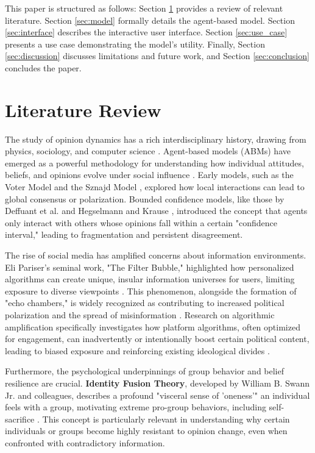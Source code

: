 \documentclass[10pt,a4paper]{article}
\begin{document}
This paper is structured as follows: Section \ref{sec:lit_review} provides a review of relevant literature. Section \ref{sec:model} formally details the agent-based model. Section \ref{sec:interface} describes the interactive user interface. Section \ref{sec:use_case} presents a use case demonstrating the model's utility. Finally, Section \ref{sec:discussion} discusses limitations and future work, and Section \ref{sec:conclusion} concludes the paper.

\section{Literature Review}
\label{sec:lit_review}
The study of opinion dynamics has a rich interdisciplinary history, drawing from physics, sociology, and computer science \citep{opinion_dynamics_review}. Agent-based models (ABMs) have emerged as a powerful methodology for understanding how individual attitudes, beliefs, and opinions evolve under social influence \citep{opinion_dynamics_abm_review}. Early models, such as the Voter Model \citep{voter_model} and the Sznajd Model \citep{sznajd_model}, explored how local interactions can lead to global consensus or polarization. Bounded confidence models, like those by Deffuant et al. \citep{deffuant2000mixing} and Hegselmann and Krause \citep{hegselmann2002opinion}, introduced the concept that agents only interact with others whose opinions fall within a certain "confidence interval," leading to fragmentation and persistent disagreement.

The rise of social media has amplified concerns about information environments. Eli Pariser's seminal work, "The Filter Bubble," highlighted how personalized algorithms can create unique, insular information universes for users, limiting exposure to diverse viewpoints \citep{pariser2011filter}. This phenomenon, alongside the formation of "echo chambers," is widely recognized as contributing to increased political polarization and the spread of misinformation \citep{algorithmic_amplification}. Research on algorithmic amplification specifically investigates how platform algorithms, often optimized for engagement, can inadvertently or intentionally boost certain political content, leading to biased exposure and reinforcing existing ideological divides \citep{algorithmic_amplification_political}.

Furthermore, the psychological underpinnings of group behavior and belief resilience are crucial. \textbf{Identity Fusion Theory}, developed by William B. Swann Jr. and colleagues, describes a profound "visceral sense of 'oneness'" an individual feels with a group, motivating extreme pro-group behaviors, including self-sacrifice \citep{swann_identity_fusion}. This concept is particularly relevant in understanding why certain individuals or groups become highly resistant to opinion change, even when confronted with contradictory information.
\end{document}
